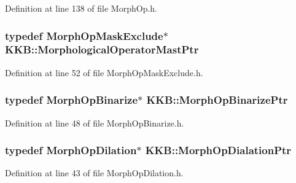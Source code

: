 Definition at line 138 of file Morph\+Op.\+h.

\subsubsection[{\texorpdfstring{Morphological\+Operator\+Mast\+Ptr}{MorphologicalOperatorMastPtr}}]{\setlength{\rightskip}{0pt plus 5cm}typedef {\bf Morph\+Op\+Mask\+Exclude}$\ast$ {\bf K\+K\+B\+::\+Morphological\+Operator\+Mast\+Ptr}}\hypertarget{namespace_k_k_b_aa31b27cc7c11d8b294b5c16d2991cd8b}{}\label{namespace_k_k_b_aa31b27cc7c11d8b294b5c16d2991cd8b}


Definition at line 52 of file Morph\+Op\+Mask\+Exclude.\+h.

\subsubsection[{\texorpdfstring{Morph\+Op\+Binarize\+Ptr}{MorphOpBinarizePtr}}]{\setlength{\rightskip}{0pt plus 5cm}typedef {\bf Morph\+Op\+Binarize}$\ast$ {\bf K\+K\+B\+::\+Morph\+Op\+Binarize\+Ptr}}\hypertarget{namespace_k_k_b_a5e6559910c34fb493f7d8d85e487f747}{}\label{namespace_k_k_b_a5e6559910c34fb493f7d8d85e487f747}


Definition at line 48 of file Morph\+Op\+Binarize.\+h.

\subsubsection[{\texorpdfstring{Morph\+Op\+Dialation\+Ptr}{MorphOpDialationPtr}}]{\setlength{\rightskip}{0pt plus 5cm}typedef {\bf Morph\+Op\+Dilation}$\ast$ {\bf K\+K\+B\+::\+Morph\+Op\+Dialation\+Ptr}}\hypertarget{namespace_k_k_b_a75ffc0eccb20b566743f9a8ffcf86604}{}\label{namespace_k_k_b_a75ffc0eccb20b566743f9a8ffcf86604}


Definition at line 43 of file Morph\+Op\+Dilation.\+h.

